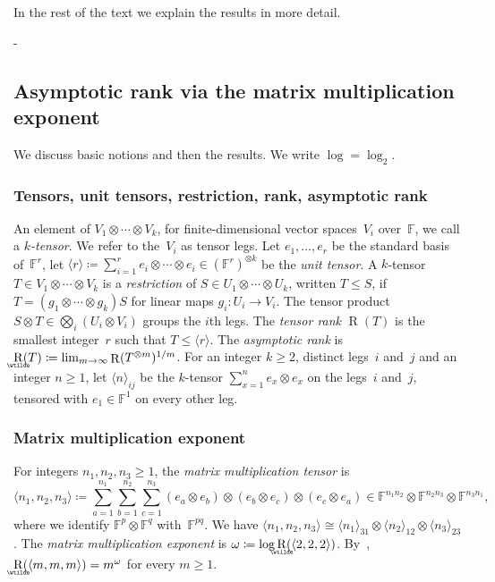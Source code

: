 \documentclass[11pt,letterpaper]{article}
\makeatletter
\numberwithin{equation}{section}
\newcommand{\reservelines}[1]{\par\penalty\z@\dimen@\pagegoal\advance\dimen@-\pagetotal
 \ifdim\dimen@<#1\baselineskip\ifdim\dimen@>\z@\vfil\fi\break\fi}
\let\plainsubsection\subsection
\renewcommand{\subsection}{\reservelines{7}\plainsubsection}
\theoremstyle{definition}
\DeclareMathOperator{\tensorrank}{R}
\DeclareMathOperator{\asymprank}{\underaccent{\wtilde}{R}}
\newcommand{\FF}{\mathbb{F}}
\makeatother
\begin{document}
In the rest of the text we explain the results in more detail.

\subsection{Asymptotic rank via the matrix multiplication exponent}\label{sec:intro-bounds}\label{sec:intro-context}

We discuss basic notions and then the results. We write $\log=\log_2$.

\subsubsection{Tensors, unit tensors, restriction, rank, asymptotic rank}

An element of
$V_1\otimes\cdots\otimes V_k$, for finite-dimensional vector spaces~$V_i$ over~$\FF$, we call a \emph{$k$-tensor}. We refer to the~$V_i$ as tensor legs. Let $e_1,\ldots,e_r$ be the standard basis of~$\FF^r$, let $\langle
r\rangle\coloneqq\sum_{i=1}^re_i\otimes\cdots\otimes e_i\in(\FF^r)^{\otimes k}$ be the \emph{unit tensor}.
A $k$-tensor $T\in V_1\otimes\cdots\otimes V_k$ is a \emph{restriction} of $S\in
U_1\otimes\cdots\otimes U_k$, written $T\le S$, if $T=(g_1\otimes\cdots\otimes g_k)S$ for linear maps $g_i\colon U_i\to
V_i$. The tensor product $S\otimes T\in\bigotimes_i(U_i\otimes V_i)$ groups the $i$th legs. The \emph{tensor rank}
$\tensorrank(T)$ is the smallest integer~$r$ such that $T\le\langle r\rangle$. The \emph{asymptotic rank} is
$\asymprank(T)\coloneqq\lim_{m\to\infty}\tensorrank(T^{\otimes m})^{1/m}$. For an integer $k\ge2$, distinct legs~$i$
and~$j$ and an integer $n\ge1$, let $\langle n\rangle_{ij}$ be the $k$-tensor $\sum_{x=1}^ne_x\otimes e_x$ on the
legs~$i$ and~$j$, tensored with $e_1\in\FF^1$ on every other leg.

\subsubsection{Matrix multiplication exponent}

For integers $n_1,n_2,n_3\ge1$, the \emph{matrix multiplication tensor} is
\[
 \langle n_1,n_2,n_3\rangle\coloneqq\sum_{a=1}^{n_1}\sum_{b=1}^{n_2}\sum_{c=1}^{n_3}(e_a\otimes e_b)\otimes(e_b\otimes
 e_c)\otimes(e_c\otimes e_a)\in\FF^{n_1n_2}\otimes\FF^{n_2n_3}\otimes\FF^{n_3n_1},
\]
where we identify $\FF^{p}\otimes\FF^{q}$ with~$\FF^{pq}$. We have
$\langle n_1,n_2,n_3\rangle \cong \langle n_1\rangle_{31}\otimes\langle n_2\rangle_{12}\otimes\langle
n_3\rangle_{23}$.  The \emph{matrix multiplication exponent} is
$\omega\coloneqq\log\asymprank(\langle2,2,2\rangle)$. By~\cite[(1.3)]{strassen1988asymptotic},
$\asymprank(\langle m,m,m\rangle)=m^\omega$ for every $m\ge1$.
\end{document}
